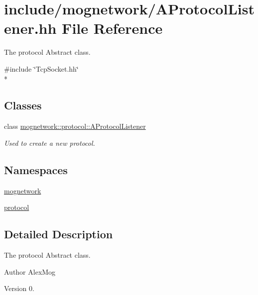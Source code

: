 \hypertarget{_a_protocol_listener_8hh}{\section{include/mognetwork/\-A\-Protocol\-Listener.hh File Reference}
\label{_a_protocol_listener_8hh}
}


The protocol Abstract class.  


{\ttfamily \#include \char`\"{}Tcp\-Socket.\-hh\char`\"{}}\\*
\subsection*{Classes}
\begin{DoxyCompactItemize}
\item 
class \hyperlink{classmognetwork_1_1protocol_1_1_a_protocol_listener}{mognetwork\-::protocol\-::\-A\-Protocol\-Listener}
\begin{DoxyCompactList}\small\item\em Used to create a new protocol. \end{DoxyCompactList}\end{DoxyCompactItemize}
\subsection*{Namespaces}
\begin{DoxyCompactItemize}
\item 
\hyperlink{namespacemognetwork}{mognetwork}
\item 
\hyperlink{namespaceprotocol}{protocol}
\end{DoxyCompactItemize}


\subsection{Detailed Description}
The protocol Abstract class. \begin{DoxyAuthor}{Author}
Alex\-Mog 
\end{DoxyAuthor}
\begin{DoxyVersion}{Version}
0. 
\end{DoxyVersion}
